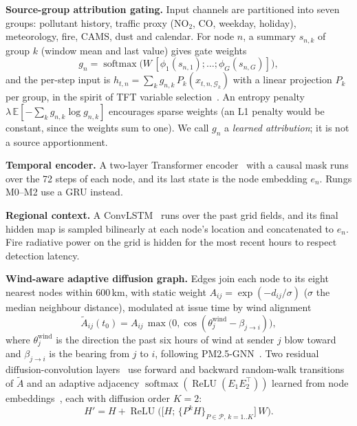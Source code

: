\documentclass[conference]{IEEEtran}
\begin{document}
\textbf{Source-group attribution gating.} Input channels are partitioned into seven groups: pollutant history, traffic
proxy (NO$_2$, CO, weekday, holiday), meteorology, fire, CAMS, dust and calendar. For node $n$, a summary $s_{n,k}$ of group
$k$ (window mean and last value) gives gate weights
\begin{equation}
g_{n} = \operatorname{softmax}\big(W\,[\phi_1(s_{n,1});\dots;\phi_G(s_{n,G})]\big),
\end{equation}
and the per-step input is $h_{t,n}=\sum_k g_{n,k}\,P_k(x_{t,n,\mathcal{G}_k})$ with a linear projection $P_k$ per group,
in the spirit of TFT variable selection~\cite{Lim_2021}. An entropy penalty $\lambda\,\mathbb{E}[-\sum_k g_{n,k}\log g_{n,k}]$
encourages sparse weights (an L1 penalty would be constant, since the weights sum to one). We call $g_n$ a \emph{learned
attribution}; it is not a source apportionment.

\textbf{Temporal encoder.} A two-layer Transformer encoder~\cite{vaswani2017attention} with a causal mask runs over the
72 steps of each node, and its last state is the node embedding $e_n$. Rungs M0--M2 use a GRU instead.

\textbf{Regional context.} A ConvLSTM~\cite{shi2015convolutional} runs over the past grid fields, and its final hidden map
is sampled bilinearly at each node's location and concatenated to $e_n$. Fire radiative power on the grid is hidden for the
most recent hours to respect detection latency.

\textbf{Wind-aware adaptive diffusion graph.} Edges join each node to its eight nearest nodes within 600\,km, with static
weight $A_{ij}=\exp(-d_{ij}/\sigma)$ ($\sigma$ the median neighbour distance), modulated at issue time by wind alignment
\begin{equation}
\tilde A_{ij}(t_0)=A_{ij}\,\max\!\big(0,\cos(\theta^{\text{wind}}_{j}-\beta_{j\to i})\big),
\end{equation}
where $\theta^{\text{wind}}_{j}$ is the direction the past six hours of wind at sender $j$ blow toward and $\beta_{j\to i}$
is the bearing from $j$ to $i$, following PM2.5-GNN~\cite{Wang_2020}. Two residual diffusion-convolution
layers~\cite{li2017diffusion} use forward and backward random-walk transitions of $\tilde A$ and an adaptive adjacency
$\operatorname{softmax}(\operatorname{ReLU}(E_1E_2^{\top}))$ learned from node embeddings~\cite{Wu_2019}, each with diffusion
order $K=2$:
\begin{equation}
H' = H + \operatorname{ReLU}\Big(\big[H;\,\{P^{k}H\}_{P\in\mathcal{P},\,k=1..K}\big]\,W\Big).
\end{equation}
\end{document}
